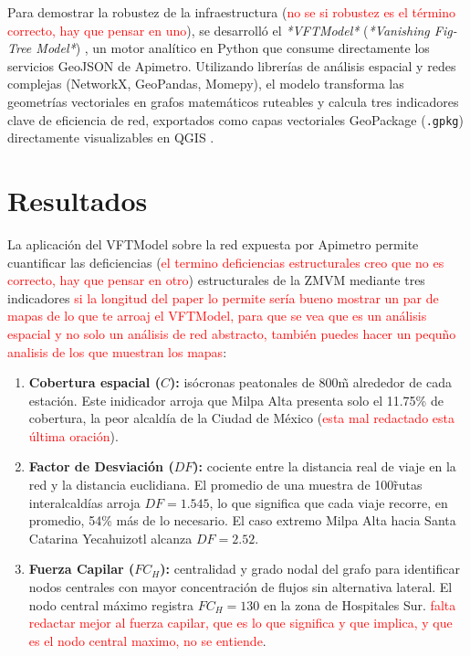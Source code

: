 \documentclass{isprs} %
\begin{document}
Para demostrar la robustez de la infraestructura (\textcolor{red}{no se si robustez es el término correcto, hay que pensar en uno}), se desarrolló el \textit{*VFTModel*} (\textit{*Vanishing Fig-Tree Model*}) \citep{galigaribaldi2026vftmodel}, un motor analítico en Python que consume directamente los servicios GeoJSON de Apimetro.  Utilizando librerías de análisis espacial y redes complejas (NetworkX, GeoPandas, Momepy), el modelo transforma las geometrías vectoriales en grafos matemáticos ruteables y calcula tres indicadores clave de eficiencia de red, exportados como capas vectoriales GeoPackage (\texttt{.gpkg}) directamente visualizables en QGIS \citep{fortin2016innovative, aldous2019optimal}.

\section{Resultados}
\label{sec:Resultados}

La aplicación del VFTModel sobre la red expuesta por Apimetro permite cuantificar las deficiencias (\textcolor{red}{el termino deficiencias estructurales creo que no es correcto, hay que pensar en otro}) estructurales de la ZMVM mediante tres indicadores \textcolor{red}{si la longitud del paper lo permite sería bueno mostrar un par de mapas de lo que te arroaj el VFTModel, para que se vea que es un análisis espacial y no solo un análisis de red abstracto, también puedes hacer un pequño analisis de los que muestran los mapas}:

\begin{enumerate}[nosep, leftmargin=1.5em]
\item \textbf{Cobertura espacial ($C$):} isócronas peatonales de 800\~m alrededor de cada estación. Este inidicador arroja que Milpa Alta presenta solo el 11.75\% de cobertura, la peor alcaldía de la Ciudad de México (\textcolor{red}{esta mal redactado esta última oración}).
\item \textbf{Factor de Desviación ($DF$):} cociente entre la distancia real de viaje en la red y la distancia euclidiana.  El promedio de una muestra de 100\~rutas interalcaldías arroja $DF=1.545$, lo que significa que cada viaje recorre, en promedio, 54\% más de lo necesario. El caso extremo Milpa Alta hacia Santa Catarina Yecahuizotl alcanza $DF=2.52$.
\item \textbf{Fuerza Capilar ($FC_H$):} centralidad y grado nodal del grafo para identificar nodos centrales con mayor concentración de flujos sin alternativa lateral.  El nodo central máximo registra $FC_H=130$ en la zona de Hospitales Sur. \textcolor{red}{falta redactar mejor al fuerza capilar, que es lo que significa y que implica, y que es el nodo central maximo, no se entiende}.
\end{enumerate}
\end{document}
